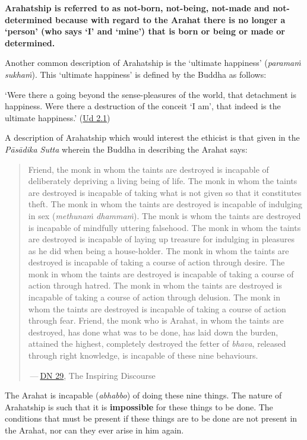 \textbf{Arahatship is referred to as not-born, not-being, not-made and not-determined because with regard to the Arahat there is no longer a `person' (who says `I' and `mine') that is born or being or made or determined.}

Another common description of Arahatship is the `ultimate happiness' (\emph{paramaṁ sukhaṁ}). This `ultimate happiness' is defined by the Buddha as follows:

`Were there a going beyond the sense-pleasures of the world, that detachment is happiness. Were there a destruction of the conceit `I am', that indeed is the ultimate happiness.' (\href{https://suttacentral.net/ud2.1/en/anandajoti}{Ud 2.1})

A description of Arahatship which would interest the ethicist is that given in the \emph{Pāsādika Sutta} wherein the Buddha in describing the Arahat says:

\begin{quote}
Friend, the monk in whom the taints are destroyed is incapable of deliberately depriving a living being of life. The monk in whom the taints are destroyed is incapable of taking what is not given so that it constitutes theft. The monk in whom the taints are destroyed is incapable of indulging in sex (\emph{methunaṁ dhammaṁ}). The monk is whom the taints are destroyed is incapable of mindfully uttering falsehood. The monk in whom the taints are destroyed is incapable of laying up treasure for indulging in pleasures as he did when being a house-holder. The monk in whom the taints are destroyed is incapable of taking a course of action through desire. The monk in whom the taints are destroyed is incapable of taking a course of action through hatred. The monk in whom the taints are destroyed is incapable of taking a course of action through delusion. The monk in whom the taints are destroyed is incapable of taking a course of action through fear. Friend, the monk who is Arahat, in whom the taints are destroyed, has done what was to be done, has laid down the burden, attained the highest, completely destroyed the fetter of \emph{bhava}, released through right knowledge, is incapable of these nine behaviours.

 --- \href{https://suttacentral.net/dn29/en/thanissaro}{DN 29}, The Inspiring Discourse
\end{quote}

The Arahat is incapable (\emph{abhabbo}) of doing these nine things. The nature of Arahatship is such that it is \textbf{impossible} for these things to be done. The conditions that must be present if these things are to be done are not present in the Arahat, nor can they ever arise in him again.

